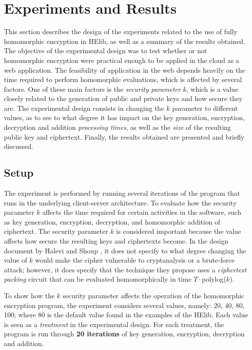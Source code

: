 \chapter{Experiments and Results}
\label{results}

This section describes the design of the experiments related to the use of fully homomorphic encryption in HElib, as well as a summary of the results obtained. The objective of the experimental design was to test whether or not homomorphic encryption were practical enough to be applied in the cloud as a web application. The feasibility of application in the web depends heavily on the time required to perform homomorphic evaluations, which is affected by several factors. One of these main factors is the \emph{security parameter} $k$, which is a value closely related to the generation of public and private keys and how secure they are. The experimental design consists in changing the $k$ parameter to different values, as to see to what degree it has impact on the key generation, encryption, decryption and addition \emph{processing times}, as well as the \emph{size} of the resulting public key and ciphertext. Finally, the results obtained are presented and briefly discussed. 

\section{Setup}

The experiment is performed by running several iterations of the program that runs in the underlying client-server architecture. To evaluate how the security parameter $k$ affects the time required for certain activities in the software, such as key generation, encryption, decryption, and homomorphic addition of ciphertext. The security parameter $k$ is considered important because the value affects how secure the resulting keys and ciphertexts become. In the design document by Halevi and Shoup \cite{cryptoeprint:2014:106}, it does not specify to what degree changing the value of $k$ would make the cipher vulnerable to cryptanalysis or a brute-force attack; however, it does specify that the technique they propose uses a \emph{ciphertext packing} circuit that can be evaluated homomorphically in time $T \cdot $polylog($k$).

To show how the $k$ security parameter affects the operation of the homomorphic encryption program, the experiment considers several values, namely: 20, 40, 80, 100; where 80 is the default value found in the examples of the HElib. Each value is seen as a \emph{treatment} in the experimental design. For each treatment, the program is run through \textbf{20 iterations} of key generation, encryption, decryption and addition. 

